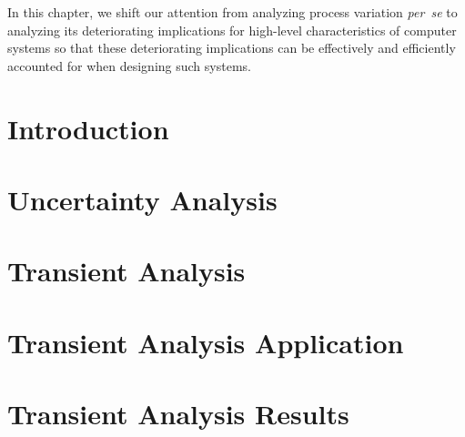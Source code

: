 In this chapter, we shift our attention from analyzing process variation
\emph{per~se} to analyzing its deteriorating implications for high-level
characteristics of computer systems so that these deteriorating implications can
be effectively and efficiently accounted for when designing such systems.

\section{Introduction}

\section{\exampletitle}

\section{\problemtitle}

\section{\priortitle}

\section{\solutiontitle}

\section{Uncertainty Analysis}

\section{Transient Analysis}

\section{Transient Analysis Application}

\section{Transient Analysis Results}

